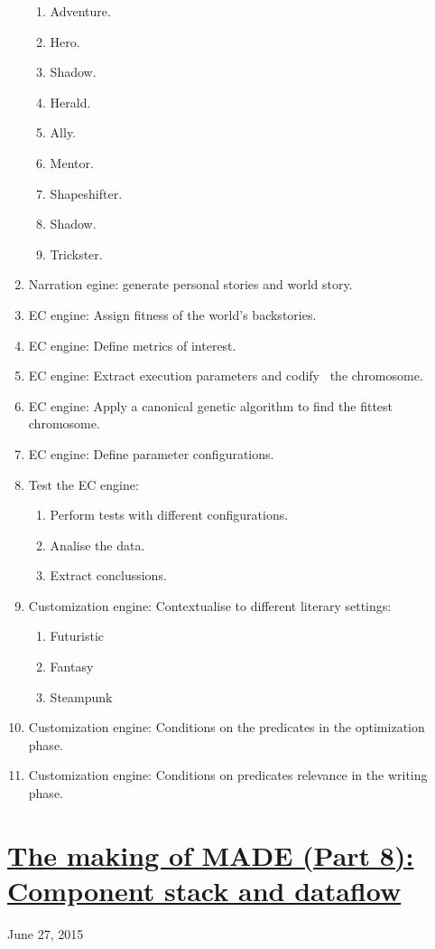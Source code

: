 \documentclass[a4paper]{article}
\begin{document}
\begin{enumerate}
\begin{enumerate}
\item Adventure. 
\item Hero. 
\item Shadow. 
\item Herald. 
\item Ally. 
\item Mentor. 
\item Shapeshifter. 
\item Shadow. 
\item Trickster. 
\end{enumerate}
\item Narration egine: generate personal stories and world story. 
\item EC engine: Assign fitness of the world{\textquoteright}s
backstories. 
\item EC engine: Define metrics of interest. 
\item EC engine: Extract execution parameters and codify~ the
chromosome. 
\item EC engine: Apply a canonical genetic algorithm to find the fittest
chromosome. 
\item EC engine: Define parameter configurations. 
\item Test the EC engine: 

\begin{enumerate}
\item Perform tests with different configurations. 
\item Analise the data. 
\item Extract conclussions. 
\end{enumerate}
\item Customization engine: Contextualise to different literary
settings: 

\begin{enumerate}
\item Futuristic 
\item Fantasy 
\item Steampunk 
\end{enumerate}
\item Customization engine: Conditions on the predicates in the
optimization phase. 
\item Customization engine: Conditions on predicates relevance in the
writing phase. 
\end{enumerate}



\bigskip

\clearpage\section[The making of MADE (Part 8): Component stack and
dataflow]{\href{http://www.velonuboso.com/made/2015/06/27/making-part-8-component-stack-dataflow/}{The
making of MADE (Part 8): Component stack and dataflow}}
June 27, 2015
\end{document}
